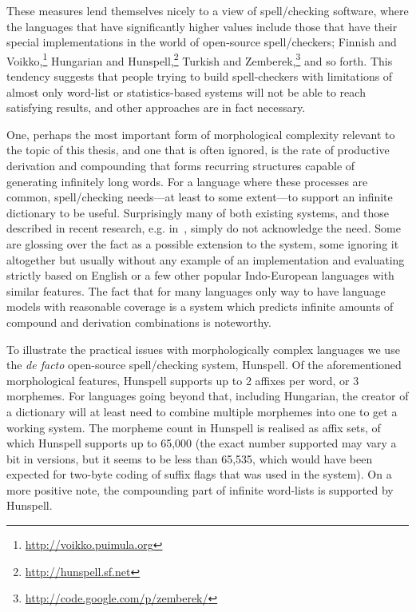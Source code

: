\documentclass[officiallayout]{unihelcompling}
\begin{document}
These measures lend themselves nicely to a view of spell\-/checking
software, where the languages that have significantly higher values 
include those that have their special implementations in the
world of open-source spell\-/checkers; Finnish and
Voikko,\footnote{\url{http://voikko.puimula.org}} Hungarian and
Hunspell,\footnote{\url{http://hunspell.sf.net}} Turkish and
Zemberek,\footnote{\url{http://code.google.com/p/zemberek/}} and so forth.
This tendency suggests that people trying to build spell-checkers with
limitations of almost only word-list or statistics-based systems will not be
able to reach satisfying results, and other approaches are in fact necessary.

One, perhaps the most important form of morphological complexity relevant to
the topic of this thesis, and one that is often ignored, is the rate of
productive derivation and compounding that forms recurring structures capable
of generating infinitely long words. For a language where these processes are
common, spell\-/checking needs---at least to some extent---to support an
infinite dictionary to be useful. Surprisingly many of both existing systems,
and those described in recent research, e.g.
in~\cite{hassan2008language,watson2003new}, simply do not acknowledge the need.
Some are glossing over the fact as a possible extension to the system, some
ignoring it altogether but usually without any example of an implementation and
evaluating strictly based on English or a few other popular Indo-European
languages with similar features. The fact that for many languages only
way to have language models with reasonable coverage is a system which predicts
infinite amounts of compound and derivation combinations is noteworthy.

To illustrate the practical issues with morphologically complex languages we
use the \emph{de facto} open-source spell\-/checking system, Hunspell. Of the
aforementioned morphological features, Hunspell supports up to 2 affixes per
word, or 3 morphemes. For languages going beyond that, including Hungarian, the
creator of a dictionary will at least need to combine multiple morphemes into
one to get a working system. The morpheme count in Hunspell is realised as
affix sets, of which Hunspell supports up to 65,000 (the exact number supported
may vary a bit in versions, but it seems to be less than 65,535, which
would have been expected for two-byte coding of suffix flags that was
used in the system). On a more
positive note, the compounding part of infinite word-lists is supported by
Hunspell.
\end{document}
